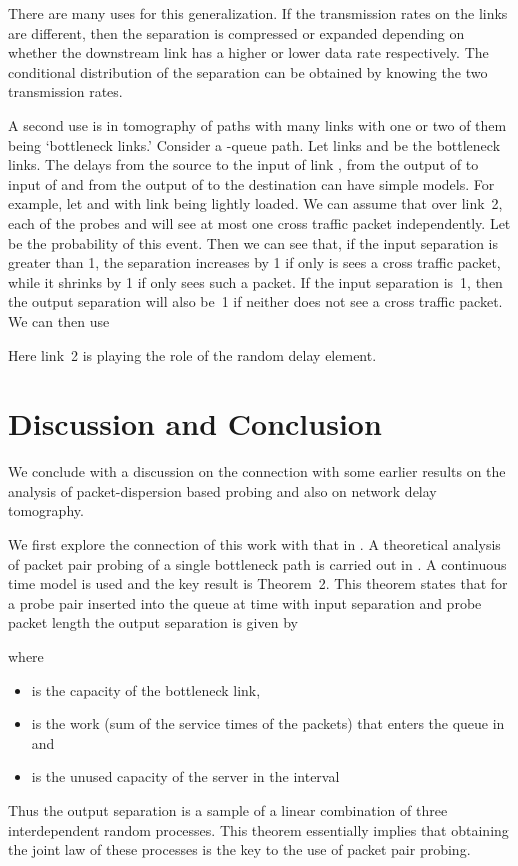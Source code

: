 \documentclass[11pt]{article}
\begin{document}
There are many uses for this generalization. If the transmission rates
on the links are different, then the separation is compressed or
expanded depending on whether the downstream link has a higher or
lower data rate respectively. The conditional distribution of the
separation can be obtained by knowing the two transmission rates.

A second use is in tomography of paths with many links with one or two
of them being `bottleneck links.' Consider a -queue path.  Let
links  and   be the bottleneck links.
The delays from the source to the input of link , from the output
of  to input of  and from the output of  to the destination
can have simple models. For example, let   and  with
link  being lightly loaded. We can assume that over link~2, each of
the probes  and  will see at most one cross traffic packet
independently. Let  be the probability of this event. Then we
can see that, if the input separation is greater than 1, the
separation increases by 1 if only  is sees a cross traffic
packet, while it shrinks by 1 if only  sees such a packet. If the
input separation is~1, then the output separation will also be~1 if
neither  does not see a cross traffic packet. We can then use

Here link~2 is playing the role of the random delay element. 

\section{Discussion and Conclusion}
\label{sec:discussion}
We conclude with a discussion on the connection with some earlier
results on the analysis of packet-dispersion based probing and also on
network delay tomography.

We first explore the connection of this work with that in
\cite{Liu05,Liu07}. A theoretical analysis of packet pair probing of a
single bottleneck path is carried out in \cite{Liu05}. A continuous
time model is used and the key result is Theorem~2. This theorem
states that for a probe pair inserted into the queue at time 
with input separation  and probe packet length  the output
separation  is given by

where  
\begin{itemize}
\item  is the capacity of the bottleneck link,
\item  is the work (sum of the service times of the
  packets) that enters the queue in  and 
\item  is the unused capacity of the server in the
  interval  
\end{itemize}
Thus the output separation is a sample of a linear combination of
three interdependent random processes. This theorem essentially
implies that obtaining the joint law of these processes is the key to
the use of packet pair probing.
\end{document}
